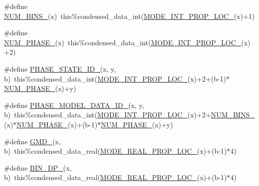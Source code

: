 \begin{DoxyCompactItemize}
\item 
\#define \mbox{\hyperlink{aero__rep__modal__binned__mass_8_f90_ae54530817d65033793af17ccdea393fc}{N\+U\+M\+\_\+\+B\+I\+N\+S\+\_\+}}(x)~this\%condensed\+\_\+data\+\_\+int(\mbox{\hyperlink{aero__rep__modal__binned__mass_8_f90_a585bf55299f2d71372c7f9bc903b91b2}{M\+O\+D\+E\+\_\+\+I\+N\+T\+\_\+\+P\+R\+O\+P\+\_\+\+L\+O\+C\+\_\+}}(x)+1)
\item 
\#define \mbox{\hyperlink{aero__rep__modal__binned__mass_8_f90_a96f3a7315e70f53597d5075f61d5c9df}{N\+U\+M\+\_\+\+P\+H\+A\+S\+E\+\_\+}}(x)~this\%condensed\+\_\+data\+\_\+int(\mbox{\hyperlink{aero__rep__modal__binned__mass_8_f90_a585bf55299f2d71372c7f9bc903b91b2}{M\+O\+D\+E\+\_\+\+I\+N\+T\+\_\+\+P\+R\+O\+P\+\_\+\+L\+O\+C\+\_\+}}(x)+2)
\item 
\#define \mbox{\hyperlink{aero__rep__modal__binned__mass_8_f90_a25f6ec1483e499d98449daade14006d0}{P\+H\+A\+S\+E\+\_\+\+S\+T\+A\+T\+E\+\_\+\+I\+D\+\_\+}}(x,  y,  b)~this\%condensed\+\_\+data\+\_\+int(\mbox{\hyperlink{aero__rep__modal__binned__mass_8_f90_a585bf55299f2d71372c7f9bc903b91b2}{M\+O\+D\+E\+\_\+\+I\+N\+T\+\_\+\+P\+R\+O\+P\+\_\+\+L\+O\+C\+\_\+}}(x)+2+(b-\/1)$\ast$\mbox{\hyperlink{aero__rep__single__particle_8_f90_aff1191174604af4c86c622f98cd18c17}{N\+U\+M\+\_\+\+P\+H\+A\+S\+E\+\_\+}}(x)+y)
\item 
\#define \mbox{\hyperlink{aero__rep__modal__binned__mass_8_f90_a3099f066dfc88d15de5e507d2ff9348e}{P\+H\+A\+S\+E\+\_\+\+M\+O\+D\+E\+L\+\_\+\+D\+A\+T\+A\+\_\+\+I\+D\+\_\+}}(x,  y,  b)~this\%condensed\+\_\+data\+\_\+int(\mbox{\hyperlink{aero__rep__modal__binned__mass_8_f90_a585bf55299f2d71372c7f9bc903b91b2}{M\+O\+D\+E\+\_\+\+I\+N\+T\+\_\+\+P\+R\+O\+P\+\_\+\+L\+O\+C\+\_\+}}(x)+2+\mbox{\hyperlink{aero__rep__modal__binned__mass_8_f90_ae54530817d65033793af17ccdea393fc}{N\+U\+M\+\_\+\+B\+I\+N\+S\+\_\+}}(x)$\ast$\mbox{\hyperlink{aero__rep__single__particle_8_f90_aff1191174604af4c86c622f98cd18c17}{N\+U\+M\+\_\+\+P\+H\+A\+S\+E\+\_\+}}(x)+(b-\/1)$\ast$\mbox{\hyperlink{aero__rep__single__particle_8_f90_aff1191174604af4c86c622f98cd18c17}{N\+U\+M\+\_\+\+P\+H\+A\+S\+E\+\_\+}}(x)+y)
\item 
\#define \mbox{\hyperlink{aero__rep__modal__binned__mass_8_f90_a9bbd4d984545fb6dd8de2bd7412074d8}{G\+M\+D\+\_\+}}(x,  b)~this\%condensed\+\_\+data\+\_\+real(\mbox{\hyperlink{aero__rep__modal__binned__mass_8_f90_ab695417de3b45908793bd92ca251cf91}{M\+O\+D\+E\+\_\+\+R\+E\+A\+L\+\_\+\+P\+R\+O\+P\+\_\+\+L\+O\+C\+\_\+}}(x)+(b-\/1)$\ast$4)
\item 
\#define \mbox{\hyperlink{aero__rep__modal__binned__mass_8_f90_ad4bc2b2dfb9f2b8b2a94fa8f8bf048da}{B\+I\+N\+\_\+\+D\+P\+\_\+}}(x,  b)~this\%condensed\+\_\+data\+\_\+real(\mbox{\hyperlink{aero__rep__modal__binned__mass_8_f90_ab695417de3b45908793bd92ca251cf91}{M\+O\+D\+E\+\_\+\+R\+E\+A\+L\+\_\+\+P\+R\+O\+P\+\_\+\+L\+O\+C\+\_\+}}(x)+(b-\/1)$\ast$4)

\end{DoxyCompactItemize}
